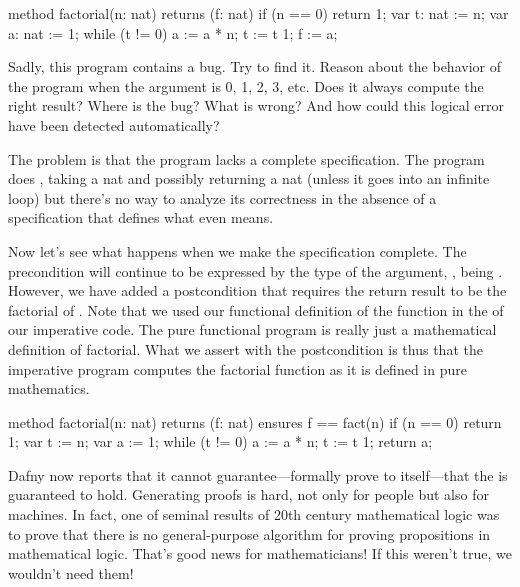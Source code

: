 \documentclass[letterpaper,10pt,english]{sphinxmanual}
\begin{document}
\begin{sphinxVerbatim}[commandchars=\\\{\}]
method factorial(n: nat) returns (f: nat)
\PYGZob{}
    if (n == 0)
    \PYGZob{}
        return 1;
    \PYGZcb{}
    var t: nat := n;
    var a: nat := 1;
    while (t !=  0)
    \PYGZob{}
        a := a * n;
        t := t \PYGZhy{} 1;
    \PYGZcb{}
    f := a;
\PYGZcb{}
\end{sphinxVerbatim}

Sadly, this program contains a bug. Try to find it. Reason about the
behavior of the program when the argument is 0, 1, 2, 3, etc.  Does it
always compute the right result? Where is the bug? What is wrong? And
how could this logical error have been detected automatically?

The problem is that the program lacks a complete specification. The
program does , taking a nat and possibly returning a nat
(unless it goes into an infinite loop) but there’s no way to analyze
its correctness in the absence of a specification that defines what
 even means.

Now let’s see what happens when we make the specification complete.
The precondition will continue to be expressed by the type of the
argument, , being . However, we have added a postcondition
that requires the return result to be the factorial of . Note that
we used our functional definition of the  function in the
 of our imperative code. The pure functional program is
really just a mathematical definition of factorial. What we assert
with the postcondition is thus that the imperative program computes
the factorial function as it is defined in pure mathematics.

\begin{sphinxVerbatim}[commandchars=\\\{\}]
method factorial(n: nat) returns (f: nat)
    ensures f == fact(n)
\PYGZob{}
    if (n == 0)
    \PYGZob{}
        return 1;
    \PYGZcb{}
    var t := n;
    var a := 1;
    while (t !=  0)
    \PYGZob{}
        a := a * n;
        t := t \PYGZhy{} 1;
    \PYGZcb{}
    return a;
\PYGZcb{}
\end{sphinxVerbatim}

Dafny now reports that it cannot guarantee—formally prove to
itself—that the  is guaranteed to hold. Generating
proofs is hard, not only for people but also for machines. In fact,
one of seminal results of 20th century mathematical logic was to prove
that there is no general-purpose algorithm for proving propositions in
mathematical logic. That’s good news for mathematicians!  If this
weren’t true, we wouldn’t need them!
\end{document}
